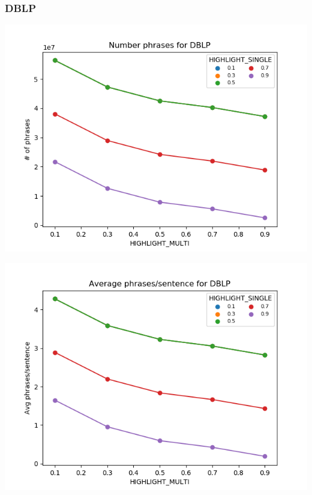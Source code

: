 \documentclass[11pt]{article}
\begin{document}
\subsubsection*{DBLP}
\begin{multicols}{2}
\includegraphics[scale=0.27]{n_phrases_dblp.png}

\includegraphics[scale=0.27]{avg_phrases_dblp.png}
\end{multicols}
\end{document}
